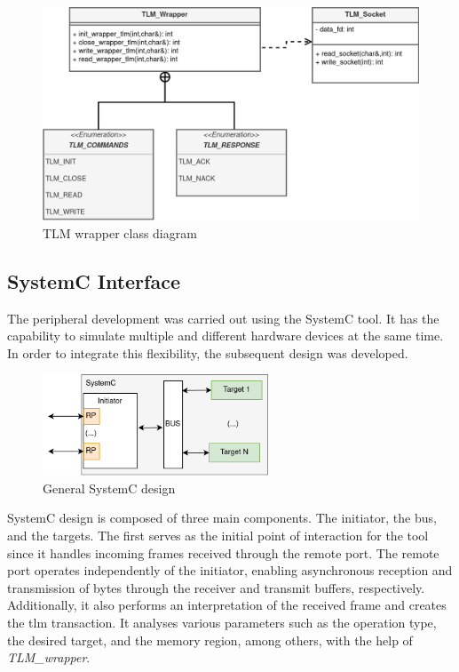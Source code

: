 \begin{figure}[!ht]
	\centering
 	\includegraphics[width=0.7\linewidth]{Images/TLM_Wrapper_ClassDiagram.png} 
 	\caption{TLM wrapper class diagram}
	\label{fig_TLM_Wrapper_ClassDiagram}
\end{figure}

\subsection{SystemC Interface}

The peripheral development was carried out using the SystemC tool. It has the capability to simulate multiple and different hardware devices 
at the same time. In order to integrate this flexibility, the subsequent design was developed.

\begin{figure}[H]
	\centering
	\includegraphics[width=0.6\textwidth]{Images/SystemCdesign.png}
	\caption{General SystemC design}
	\label{fig_SystemCdesign_geral}
\end{figure}


SystemC design is composed of three main components. The initiator, the bus, and the targets. The first serves as the initial 
point of interaction for the tool since it handles incoming frames received through the remote port. The remote port operates independently 
of the initiator, enabling asynchronous reception and transmission of bytes through the receiver and transmit buffers, respectively.
Additionally, it also performs an interpretation of the received frame and creates the \gls{tlm} transaction. It analyses various 
parameters such as the operation type, the desired target, and the memory region, among others, with the help of \textit{TLM\_wrapper}.

